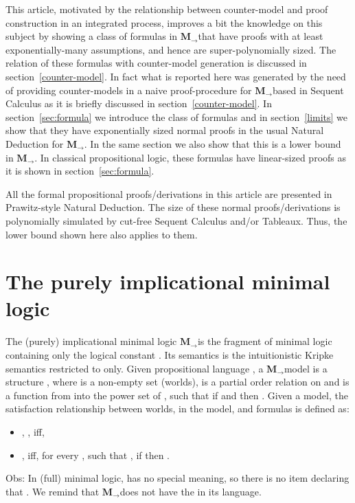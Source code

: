 \documentclass[11pt]{llncs}
\newcommand{\mil}{\ensuremath{\mathbf{M}_{\rightarrow}}}
\begin{document}
This article, motivated by the relationship between counter-model and proof construction in an integrated process,  improves a bit the knowledge on this subject by showing  a class of formulas in \mil that have proofs with at least exponentially-many assumptions, and hence are super-polynomially sized. The relation of these formulas with counter-model generation is discussed in section~\ref{counter-model}. In fact what is reported here was generated by the need of providing counter-models in a naive proof-procedure  for \mil based in Sequent Calculus as it is briefly discussed in section~\ref{counter-model}. In section~\ref{sec:formula} we introduce the class of formulas and in section~\ref{limits} we show  that  
they have exponentially sized normal proofs in the usual Natural Deduction for \mil. In the same section we also show that this is a lower bound in \mil. In classical propositional logic, these formulas have linear-sized proofs as it is shown in section~\ref{sec:formula}.

 All the formal propositional proofs/derivations in this article are presented in Prawitz-style Natural Deduction. The size of these normal proofs/derivations is polynomially simulated by cut-free Sequent Calculus and/or Tableaux. Thus, the lower bound shown here also applies to them.   



\section{The purely implicational minimal logic}

The (purely) implicational minimal logic \mil is the fragment of minimal logic containing only the logical constant . Its semantics is the intuitionistic Kripke semantics restricted to  only. Given propositional language , a \mil model is a structure , where  is a non-empty set (worlds),  is a partial order relation on  and  is a function from  into the power set of , such that if  and  then . Given a model, the satisfaction relationship  between worlds, in the model,  and formulas is defined as:
\begin{itemize}
\item , , iff, 
\item , iff, for every , such that , if  then .
\end{itemize}

Obs: In (full) minimal logic,  has no special meaning, so there is no item declaring that . We remind that \mil does not have the  in its language.  
\end{document}
